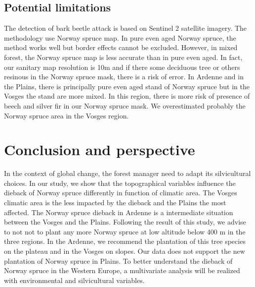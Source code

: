 \documentclass[3p,procedia]{elsarticle}
\begin{document}
 

 

\subsection{Potential limitations}
The detection of bark beetle attack is based on Sentinel 2 satellite imagery.
The methodology use Norway spruce map. 
In pure even aged Norway spruce, the method works well but border effects cannot be excluded. 
However, in mixed forest, the Norway spruce map is less accurate than in pure even aged.
In fact, our sanitary map resolution is 10m and if there some deciduous tree or others resinous in the Norway spruce mask, there is a risk of error.
In Ardenne and in the Plains, there is principally pure even aged stand of Norway spruce but in the Vosges the stand are more mixed.
In this region, there is more risk of presence of beech and silver fir in our Norway spruce mask.
We overestimated probably the Norway spruce area in the Vosges region.
 
\section{Conclusion and perspective}

In the context of global change, the forest manager need to adapt its silvicultural choices.
In our study, we show that the topographical variables influence the dieback of Norway spruce differently  in function of climatic area.
The Vosges climatic area is the less impacted by the dieback and the Plains the most affected.
The Norway spruce dieback in Ardenne is a intermediate situation between the Vosges and the Plains.
Following the result of this study, we advise to not  not to plant any more Norway spruce at low altitude below 400 m in the three regions.
In the Ardenne, we recommend the plantation of this tree species on the plateau and in the Vosges on slopes. 
Our data does not support the new plantation of Norway spruce in Plains.
To better understand the dieback of Norway spruce in the Western Europe, a multivariate analysis will be realized with environmental and silvicultural variables.
\end{document}

